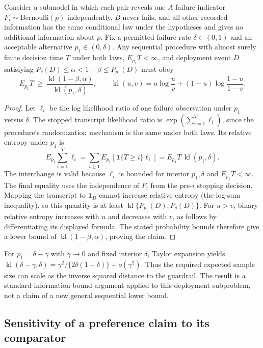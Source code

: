 \begin{proposition}
\label{prop:guardrail_lower_bound}
Consider a submodel in which each pair reveals one $A$ failure
indicator $F_i\sim\mathrm{Bernoulli}(p)$ independently, $B$ never
fails, and all other recorded information has the same conditional law
under the hypotheses and gives no additional information about $p$.
Fix a permitted failure rate $\delta\in(0,1)$ and an acceptable
alternative $p_1\in(0,\delta)$. Any sequential procedure with almost
surely finite decision time $T$ under both laws, $E_{p_1}T<\infty$,
and deployment event $D$ satisfying
$P_{\delta}(D)\leq\alpha<1-\beta\leq P_{p_1}(D)$ must obey
\[
 E_{p_1}T\ \geq\
 \frac{\operatorname{kl}(1-\beta,\alpha)}
      {\operatorname{kl}(p_1,\delta)},
 \qquad
 \operatorname{kl}(u,v)=u\log\frac uv+(1-u)\log\frac{1-u}{1-v}.
\]
\end{proposition}
\begin{proof}
Let $\ell_i$ be the log likelihood ratio of one failure observation
under $p_1$ versus $\delta$. The stopped transcript likelihood ratio
is $\exp(\sum_{i=1}^T\ell_i)$, since the procedure's randomization
mechanism is the same under both laws. Its relative entropy under
$p_1$ is
\[
 E_{p_1}\sum_{i=1}^T\ell_i
 =\sum_{i\geq1} E_{p_1}[\mathbf1\{T\geq i\}\ell_i]
 =E_{p_1}T\,\operatorname{kl}(p_1,\delta).
\]
The interchange is valid because $\ell_i$ is bounded for interior
$p_1,\delta$ and $E_{p_1}T<\infty$. The final equality uses the
independence of $F_i$ from the pre-$i$ stopping decision.
Mapping the transcript to $\mathbf1_D$ cannot increase relative
entropy (the log-sum inequality), so this quantity is at least
$\operatorname{kl}\{P_{p_1}(D),P_\delta(D)\}$.
For $u>v$, binary relative entropy increases with $u$ and decreases
with $v$, as follows by differentiating its displayed formula.
The stated probability bounds therefore give a lower bound of
$\operatorname{kl}(1-\beta,\alpha)$, proving the claim.
\end{proof}

For $p_1=\delta-\gamma$ with $\gamma\to0$ and fixed interior $\delta$,
Taylor expansion yields
$\operatorname{kl}(\delta-\gamma,\delta)
=\gamma^2/\{2\delta(1-\delta)\}+o(\gamma^2)$.
Thus the required expected sample size can scale as the inverse squared
distance to the guardrail. The result is a standard information-bound
argument applied to this deployment subproblem, not a claim of a new
general sequential lower bound.

\subsection{Sensitivity of a preference claim to its comparator}

